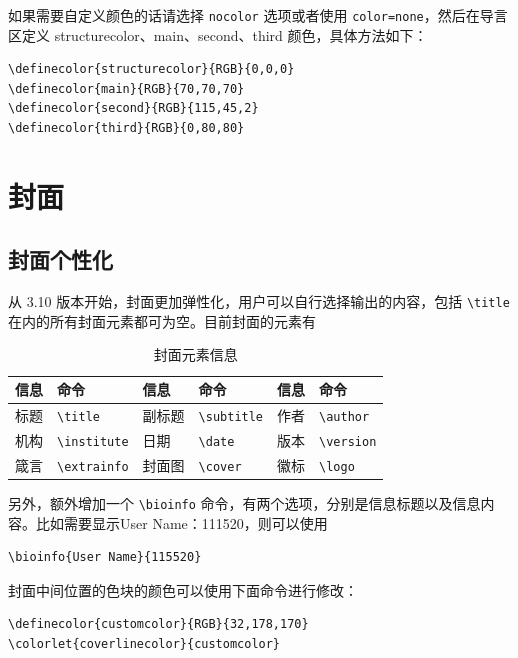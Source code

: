\documentclass[lang=cn,10pt,cite=super]{elegantbook}
\begin{document}
如果需要自定义颜色的话请选择 \lstinline{nocolor} 选项或者使用 \lstinline{color=none}，然后在导言区定义 structurecolor、main、second、third 颜色，具体方法如下：
\begin{lstlisting}[tabsize=4]
\definecolor{structurecolor}{RGB}{0,0,0}
\definecolor{main}{RGB}{70,70,70}    
\definecolor{second}{RGB}{115,45,2}    
\definecolor{third}{RGB}{0,80,80}
\end{lstlisting}

\section{封面}

\subsection{封面个性化}

从 3.10 版本开始，封面更加弹性化，用户可以自行选择输出的内容，包括 \lstinline{\title} 在内的所有封面元素都可为空。目前封面的元素有

\begin{table}[htbp]
  \centering
  \caption{封面元素信息}
  \begin{tabular}{p{}p{}|p{}p{}|p{}p{}}
    \toprule
    信息 & 命令 & 信息 & 命令 & 信息 & 命令 \\
    \midrule
    标题 & \lstinline|\title| & 副标题 & \lstinline|\subtitle| & 作者 & \lstinline|\author| \\
    机构 & \lstinline|\institute| & 日期 &  \lstinline|\date| & 版本 & \lstinline|\version| \\
    箴言 & \lstinline|\extrainfo| & 封面图 & \lstinline|\cover| & 徽标 & \lstinline|\logo| \\
    \bottomrule
  \end{tabular}
\end{table}

另外，额外增加一个 \lstinline{\bioinfo} 命令，有两个选项，分别是信息标题以及信息内容。比如需要显示{\kaishu User Name：111520}，则可以使用 
\begin{lstlisting}
\bioinfo{User Name}{115520}
\end{lstlisting}

封面中间位置的色块的颜色可以使用下面命令进行修改：
\begin{lstlisting}
\definecolor{customcolor}{RGB}{32,178,170}
\colorlet{coverlinecolor}{customcolor}
\end{lstlisting}
\end{document}
